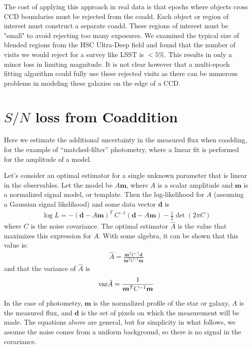 \documentclass[fleqn,useAMS,usenatbib]{mnras}
\begin{document}
The cost of applying this approach in real data is that epochs where objects cross CCD boundaries must be rejected from the coadd.  Each object or region of interest must construct a separate coadd.  These regions of interest must be "small" to avoid rejecting too many exposures.  We examined the typical size of blended regions from the HSC Ultra-Deep field and found that the number of visits we would reject for a survey like LSST is $< 5\%$.  This results in only a minor loss in limiting magnitude.  It is not clear however that a multi-epoch fitting algorithm could fully use these rejected visits as there can be numerous problems in modeling these galaxies on the edge of a CCD.






\section{$S/N$ loss from Coaddition} \label{Section:FluxSN}

Here we estimate the additional uncertainty in the measured flux when coadding,
for the example of ``matched-filter'' photometry, where a linear fit is performed
for the amplitude of a model.

Let's consider an optimal estimator for a single unknown parameter that is
linear in the observables. Let the model be $A\boldsymbol{m}$, where $A$ is a
scalar amplitude and $\boldsymbol{m}$ is a normalized signal model, or
template. Then the log-likelihood for $A$ (assuming a Gaussian signal
likelihood) and some data vector $\boldsymbol{d}$ is
\begin{align}
  \log L = - (\boldsymbol{d} - A\boldsymbol{m})^T\: C^{-1} (\boldsymbol{d} - A\boldsymbol{m}) - \frac{1}{2} \det(2\pi C )
\end{align}
where $C$ is the noise covariance.  The optimal estimator $\hat{A}$ is the
value that maximizes this expression for $A$. With some algebra, it can be
shown that this value is:
\begin{align}
\hat{A} = \frac{\boldsymbol{m}^T C^{-1} \boldsymbol{d}}{\boldsymbol{m}^T C^{-1} \boldsymbol{m}}
\end{align}
and that the variance of $\hat{A}$ is
\begin{align}
{\rm var}\hat{A} = \frac{1}{{\boldsymbol{m}^T C^{-1} \boldsymbol{m}}}
\end{align}

In the case of photometry, $\boldsymbol{m}$ is the normalized profile of the
star or galaxy, $A$ is the measured flux, and $\boldsymbol{d}$ is the set of
pixels on which the measurement will be made.  The equations above are general,
but for simplicity in what follows, we assume the noise comes from a uniform
background, so there is no signal in the covariance.
\end{document}
